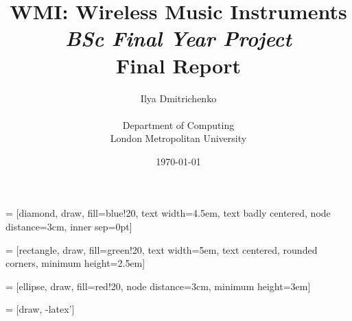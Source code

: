 
\newcommand{\Blob}[1]{\Href{https://github.com/errordeveloper/contiki-wmi/blob/wmi-work/#1}{\texttt{#1}}}
\newcommand{\Tree}[1]{\Href{https://github.com/errordeveloper/contiki-wmi/tree/wmi-work/#1}{\texttt{#1}}}
\newcommand{\Blame}[1]{\Href{https://github.com/errordeveloper/contiki-wmi/blame/wmi-work/#1}{\texttt{#1}}}

\usepackage{tikz}
\usetikzlibrary{automata,positioning,shapes,arrows}

 = [diamond,
			draw, fill=blue!20,
			text width=4.5em, text badly centered,
			node distance=3cm, inner sep=0pt]

 = [rectangle,
			draw, fill=green!20,
			text width=5em, text centered,
			rounded corners, minimum height=2.5em]

 = [ellipse,
			draw, fill=red!20,
			node distance=3cm, minimum height=3em]

 = [draw, -latex']

\usepackage{pstricks-add}


\title{WMI: Wireless Music Instruments\\ \emph{BSc Final Year Project} \\ Final Report}
\author{Ilya Dmitrichenko \\ \\ Department of Computing\\ London Metropolitan University}

\date{\today}




\maketitle


